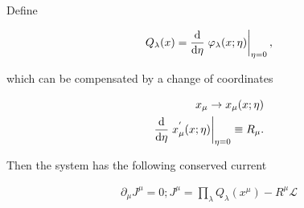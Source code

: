 Define 

\begin{align*}
    Q_\lambda (x) = \dv{}{\eta}\eval{\p_\lambda (x; \eta)}_{\eta = 0},
\end{align*}

which can be compensated by a change of coordinates 

\begin{align*}
    x_\mu \to x_\mu (x; \eta) \\ 
    \dv{}{\eta} \eval{x_\mu^{'} (x; \eta)}_{\eta = 0} \equiv R_\mu.
\end{align*}

Then the system has the following conserved current 

\begin{align*}
    \partial_\mu J^\mu = 0; J^\mu = \prod_\lambda Q_\lambda (x^\mu) - R^\mu \mathcal{L}
\end{align*}